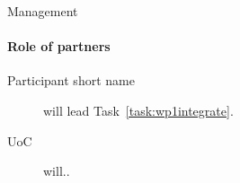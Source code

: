 \begin{workpackage}{Management}
\begin{wpdescription}
    \paragraph{Role of partners}
    \begin{description}
      \item[Participant short name] will lead Task~\ref{task:wp1integrate}.
      \item[UoC] will..
    \end{description}
  \end{wpdescription}

  \begin{wpdeliverables}

    \label{dev:wp1datamanagement}

    \label{dev:wp1implementation}

    \label{dev:wp1prototype}

  \end{wpdeliverables}

\end{workpackage}


